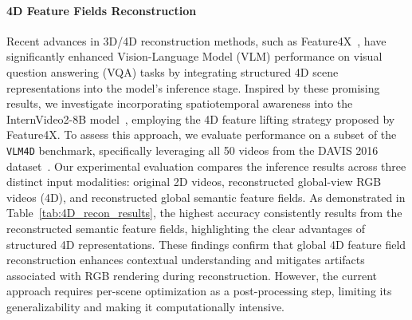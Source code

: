 \paragraph{4D Feature Fields Reconstruction} Recent advances in 3D/4D reconstruction methods, such as Feature4X~\cite{zhou2025feature4x}, have significantly enhanced Vision-Language Model (VLM) performance on visual question answering (VQA) tasks by integrating structured 4D scene representations into the model’s inference stage. Inspired by these promising results, we investigate incorporating spatiotemporal awareness into the InternVideo2-8B model~\cite{wang2024internvideo2}, employing the 4D feature lifting strategy proposed by Feature4X. To assess this approach, we evaluate performance on a subset of the \texttt{VLM4D} benchmark, specifically leveraging all 50 videos from the DAVIS 2016 dataset~\cite{perazzi2016benchmark}.
Our experimental evaluation compares the inference results across three distinct input modalities: original 2D videos, reconstructed global-view RGB videos (4D), and reconstructed global semantic feature fields. As demonstrated in Table~\ref{tab:4D_recon_results}, the highest accuracy consistently results from the reconstructed semantic feature fields, highlighting the clear advantages of structured 4D representations. These findings confirm that global 4D feature field reconstruction enhances contextual understanding and mitigates artifacts associated with RGB rendering during reconstruction. However, the current approach requires per-scene optimization as a post-processing step, limiting its generalizability and making it computationally intensive.

